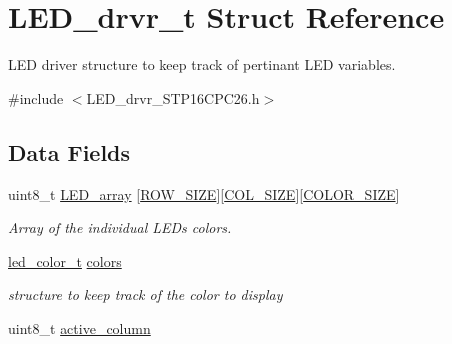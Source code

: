 \hypertarget{struct_l_e_d__drvr__t}{}\section{L\+E\+D\+\_\+drvr\+\_\+t Struct Reference}
\label{struct_l_e_d__drvr__t}


L\+ED driver structure to keep track of pertinant L\+ED variables.  




{\ttfamily \#include $<$L\+E\+D\+\_\+drvr\+\_\+\+S\+T\+P16\+C\+P\+C26.\+h$>$}

\subsection*{Data Fields}
\begin{DoxyCompactItemize}
\item 
\hypertarget{struct_l_e_d__drvr__t_aff6aed840461f5e82af8be24a360ec74}{}\label{struct_l_e_d__drvr__t_aff6aed840461f5e82af8be24a360ec74} 
uint8\+\_\+t \hyperlink{struct_l_e_d__drvr__t_aff6aed840461f5e82af8be24a360ec74}{L\+E\+D\+\_\+array} \mbox{[}\hyperlink{_l_e_d__drvr___s_t_p16_c_p_c26_8h_aa4d030604a90c8d019d90fc721900d63}{R\+O\+W\+\_\+\+S\+I\+ZE}\mbox{]}\mbox{[}\hyperlink{_l_e_d__drvr___s_t_p16_c_p_c26_8h_a99468544016f0abb855e6415c629ec29}{C\+O\+L\+\_\+\+S\+I\+ZE}\mbox{]}\mbox{[}\hyperlink{_l_e_d__drvr___s_t_p16_c_p_c26_8h_a68a80be4e42506b0127b8559bc6662b0}{C\+O\+L\+O\+R\+\_\+\+S\+I\+ZE}\mbox{]}
\begin{DoxyCompactList}\small\item\em Array of the individual L\+E\+Ds colors. \end{DoxyCompactList}\item 
\hypertarget{struct_l_e_d__drvr__t_a479d20e839f786b179a1a7ddb34e35a9}{}\label{struct_l_e_d__drvr__t_a479d20e839f786b179a1a7ddb34e35a9} 
\hyperlink{structled__color__t}{led\+\_\+color\+\_\+t} \hyperlink{struct_l_e_d__drvr__t_a479d20e839f786b179a1a7ddb34e35a9}{colors}
\begin{DoxyCompactList}\small\item\em structure to keep track of the color to display \end{DoxyCompactList}\item 
\hypertarget{struct_l_e_d__drvr__t_a3a2948aab6633f25d9240c3d80083b3a}{}\label{struct_l_e_d__drvr__t_a3a2948aab6633f25d9240c3d80083b3a} 
uint8\+\_\+t \hyperlink{struct_l_e_d__drvr__t_a3a2948aab6633f25d9240c3d80083b3a}{active\+\_\+column}

\end{DoxyCompactItemize}
